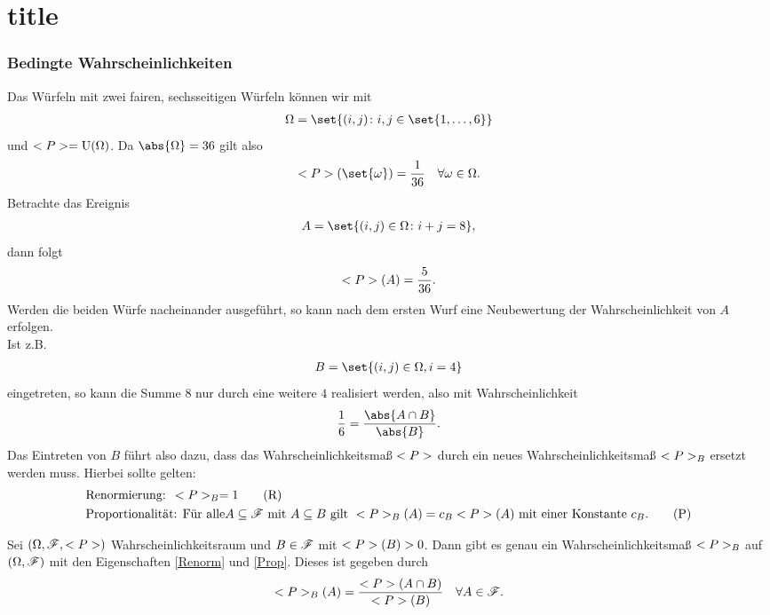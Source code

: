\part{title}\section{Bedingte Wahrscheinlichkeiten}
\begin{example}
	Das Würfeln mit zwei fairen, sechsseitigen Würfeln können wir mit 
	\begin{align}
		\O = \set{(i,j) \colon i,j \in \set{1,\dots,6}}\notag
	\end{align}
	und $\P = \Gleich(\O)$. Da $\abs{\O} = 36$ gilt also
	\begin{align}
		\P(\set{\omega}) = \frac{1}{36} \quad \forall \omega \in \O.\notag
	\end{align}
	Betrachte das Ereignis
	\begin{align}
		A = \set{(i,j) \in \O \colon i + j = 8},\notag
	\end{align}
	dann folgt
	\begin{align}
		\P(A) = \frac{5}{36}.\notag
	\end{align}
	Werden die beiden Würfe nacheinander ausgeführt, so kann nach dem ersten Wurf eine Neubewertung der Wahrscheinlichkeit von $A$ erfolgen.\\
	Ist z.B.
	\begin{align}
		B = \set{(i,j) \in \O, i = 4}\notag
	\end{align}
	eingetreten, so kann die Summe $8$ nur durch eine weitere $4$ realisiert werden, also mit Wahrscheinlichkeit
	\begin{align}
		\frac{1}{6} = \frac{\abs{A \cap B}}{\abs{B}}.\notag 
	\end{align}
	Das Eintreten von $B$ führt also dazu, dass das Wahrscheinlichkeitsmaß $\P$ durch ein neues Wahrscheinlichkeitsmaß $\P_{B}$ ersetzt werden muss. Hierbei sollte gelten:
	\begin{align}
		 &\text{Renormierung: }\P_{B} = 1\label{Renorm}\tag{R}\\
		 &\text{Proportionalität: Für alle} A \subseteq \F \mit A \subseteq B \text{ gilt }
		 \P_{B}(A) = c_B \P(A) \text{ mit einer Konstante } c_B.\label{Prop}\tag{P}
    \end{align}
\end{example}

\begin{lemma}
	Sei $(\O, \F, \P)$ Wahrscheinlichkeitsraum und $B \in \F$ mit $\P(B) > 0$. Dann gibt es genau ein Wahrscheinlichkeitsmaß $\P_B$ auf $(\O, \F)$ mit den Eigenschaften \eqref{Renorm} und \eqref{Prop}. Dieses ist gegeben durch
	\begin{align}
		\P_{B}(A) = \frac{\P(A\cap B)}{\P(B)} \quad \forall A \in \F.\notag
	\end{align}
\end{lemma}

